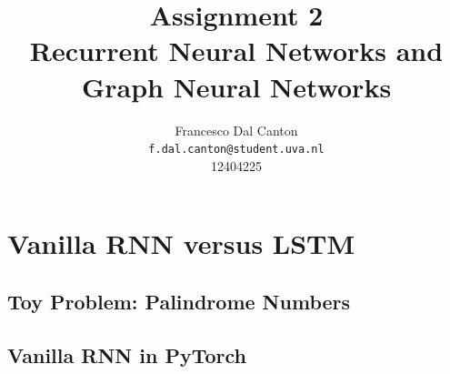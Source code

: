 \documentclass{article}
\title{Assignment 2\\Recurrent Neural Networks and Graph Neural Networks}
\author{
  Francesco Dal Canton \\
  \texttt{f.dal.canton@student.uva.nl} \\
  12404225
}
\begin{document}
\maketitle

\section{Vanilla RNN versus LSTM}

\subsection{Toy Problem: Palindrome Numbers}

\subsection{Vanilla RNN in PyTorch}
\end{document}
